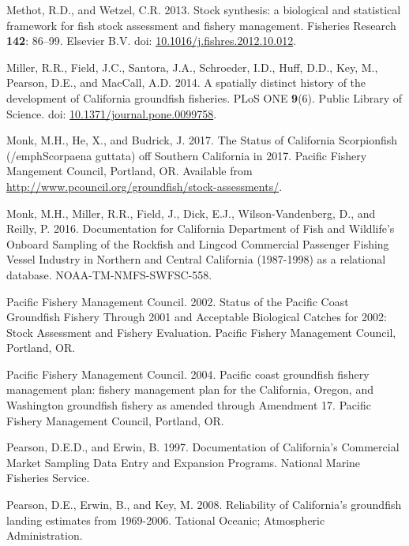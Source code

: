 \documentclass[
  english,
  a4paper,
]{article}
\newlength{\cslhangindent}
\newlength{\cslentryspacingunit} %
\newenvironment{CSLReferences}[2] %
 {%
  \setlength{\parindent}{0pt}
  \ifodd #1
  \let\oldpar\par
  \def\par{\hangindent=\cslhangindent\oldpar}
  \fi
  \setlength{\parskip}{#2\cslentryspacingunit}
 }%
 {}
\begin{document}
\begin{CSLReferences}{1}{0}
\leavevmode{}%
Methot, R.D., and Wetzel, C.R. 2013. {Stock synthesis: a biological and statistical framework for fish stock assessment and fishery management}. Fisheries Research \textbf{142}: 86--99. Elsevier B.V. doi: \href{https://doi.org/10.1016/j.fishres.2012.10.012}{10.1016/j.fishres.2012.10.012}.

\leavevmode{}%
Miller, R.R., Field, J.C., Santora, J.A., Schroeder, I.D., Huff, D.D., Key, M., Pearson, D.E., and MacCall, A.D. 2014. {A spatially distinct history of the development of California groundfish fisheries}. PLoS ONE \textbf{9}(6). Public Library of Science. doi: \href{https://doi.org/10.1371/journal.pone.0099758}{10.1371/journal.pone.0099758}.

\leavevmode{}%
Monk, M.H., He, X., and Budrick, J. 2017. {The Status of California Scorpionfish (/emph{Scorpaena guttata}) off Southern California in 2017}. Pacific Fishery Mangement Council, Portland, OR. Available from \url{http://www.pcouncil.org/groundfish/stock-assessments/}.

\leavevmode{}%
Monk, M.H., Miller, R.R., Field, J., Dick, E.J., Wilson-Vandenberg, D., and Reilly, P. 2016. {Documentation for California Department of Fish and Wildlife's Onboard Sampling of the Rockfish and Lingcod Commercial Passenger Fishing Vessel Industry in Northern and Central California (1987-1998) as a relational database}. NOAA-TM-NMFS-SWFSC-558.

\leavevmode{}%
Pacific Fishery Management Council. 2002. {Status of the Pacific Coast Groundfish Fishery Through 2001 and Acceptable Biological Catches for 2002: Stock Assessment and Fishery Evaluation.} Pacific Fishery Management Council, Portland, OR.

\leavevmode{}%
Pacific Fishery Management Council. 2004. {Pacific coast groundfish fishery management plan: fishery management plan for the California, Oregon, and Washington groundfish fishery as amended through Amendment 17}. Pacific Fishery Management Council, Portland, OR.

\leavevmode{}%
Pearson, D.E.D., and Erwin, B. 1997. {Documentation of California's Commercial Market Sampling Data Entry and Expansion Programs}. National Marine Fisheries Service.

\leavevmode{}%
Pearson, D.E., Erwin, B., and Key, M. 2008. {Reliability of California's groundfish landing estimates from 1969-2006}. Tational Oceanic; Atmospheric Administration.


\end{CSLReferences}
\end{document}
